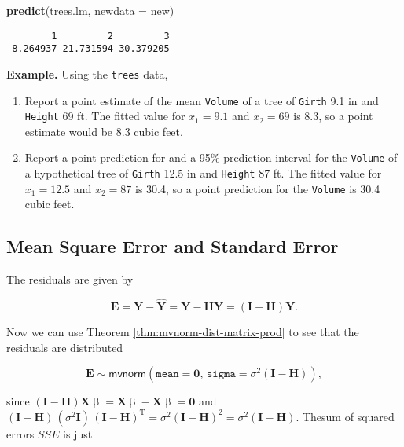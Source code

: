 \documentclass[]{book}
\newenvironment{Shaded}{\begin{snugshade}}{\end{snugshade}}
\newcommand{\KeywordTok}[1]{\textcolor[rgb]{0.13,0.29,0.53}{\textbf{{#1}}}}
\newcommand{\DataTypeTok}[1]{\textcolor[rgb]{0.13,0.29,0.53}{{#1}}}
\newcommand{\NormalTok}[1]{{#1}}
\providecommand{\tightlist}{%
  \setlength{\itemsep}{0pt}\setlength{\parskip}{0pt}}
\numberwithin{equation}{chapter}
\numberwithin{figure}{chapter}
\theoremstyle{plain}
\theoremstyle{definition}
\theoremstyle{remark}
\theoremstyle{definition}
\theoremstyle{definition}
\theoremstyle{remark}
\begin{document}
\begin{Shaded}
\begin{Highlighting}[]
\KeywordTok{predict}\NormalTok{(trees.lm, }\DataTypeTok{newdata =} \NormalTok{new)}
\end{Highlighting}
\end{Shaded}

\begin{verbatim}
        1         2         3 
 8.264937 21.731594 30.379205 
\end{verbatim}

\textbf{Example.} Using the \texttt{trees} data,

\begin{enumerate}
\def\labelenumi{\arabic{enumi}.}
\tightlist
\item
  Report a point estimate of the mean \texttt{Volume} of a tree of
  \texttt{Girth} 9.1 in and \texttt{Height} 69 ft. The fitted value for
  \(x_{1}=9.1\) and \(x_{2} = 69\) is 8.3, so a point estimate would be
  8.3 cubic feet.
\item
  Report a point prediction for and a 95\% prediction interval for the
  \texttt{Volume} of a hypothetical tree of \texttt{Girth} 12.5 in and
  \texttt{Height} 87 ft. The fitted value for \(x_{1} = 12.5\) and
  \(x_{2} = 87\) is 30.4, so a point prediction for the \texttt{Volume}
  is 30.4 cubic feet.
\end{enumerate}

\subsection{Mean Square Error and Standard Error}\label{sub-mlr-mse-se}

The residuals are given by

\begin{equation}
\mathbf{E}=\mathbf{Y}-\hat{\mathbf{Y}}=\mathbf{Y}-\mathbf{H}\mathbf{Y}=(\mathbf{I}-\mathbf{H})\mathbf{Y}.
\end{equation}

Now we can use Theorem \ref{thm:mvnorm-dist-matrix-prod} to see that the
residuals are distributed

\begin{equation}
\mathbf{E}\sim\mathsf{mvnorm}(\mathtt{mean}=\mathbf{0},\,\mathtt{sigma}=\sigma^{2}(\mathbf{I}-\mathbf{H})),
\end{equation}

since
\((\mathbf{I}-\mathbf{H})\mathbf{X}\upbeta=\mathbf{X}\upbeta-\mathbf{X}\upbeta=\mathbf{0}\)
and
\((\mathbf{I}-\mathbf{H})\,(\sigma^{2}\mathbf{I})\,(\mathbf{I}-\mathbf{H})^{\mathrm{T}}=\sigma^{2}(\mathbf{I}-\mathbf{H})^{2}=\sigma^{2}(\mathbf{I}-\mathbf{H})\).
Thesum of squared errors \(SSE\) is just
\end{document}
